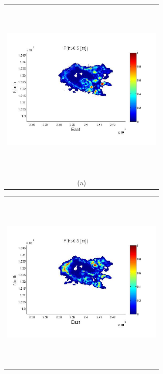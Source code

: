 \documentclass{article}
\newcommand{\Pic}[2][0.85]{\begin{center}\texttt{[image: \#2]}
 \end{center} }
\begin{document}
\begin{figure}[H]
      \begin{minipage}[b]{0.6\textwidth}
        \begin{tabular}{c}
       \includegraphics[width=8cm,height=9cm,keepaspectratio]{figs/Galeras0_minus_Aster30.jpg}\\
        (a)
        \end{tabular}
    \end{minipage}
    \begin{minipage}{0.6\textwidth}
        \begin{tabular}{c}
	\includegraphics[width=8cm,height=9cm,keepaspectratio]{figs/Galeras3_minus_Aster30.jpg}\\

\end{tabular}
\end{minipage}
\end{figure}
\end{document}
